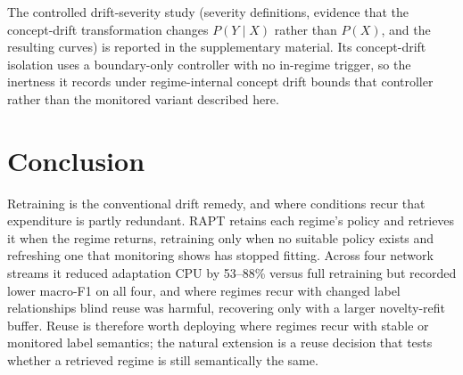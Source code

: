 \documentclass[conference]{IEEEtran}
\begin{document}
The controlled drift-severity study (severity definitions, evidence that the
concept-drift transformation changes $P(Y\mid X)$ rather than $P(X)$, and the
resulting curves) is reported in the supplementary material. Its concept-drift
isolation uses a boundary-only controller with no in-regime trigger, so the inertness
it records under regime-internal concept drift bounds that controller rather than the
monitored variant described here.



\section{Conclusion}

Retraining is the conventional drift remedy, and where conditions recur that
expenditure is partly redundant. RAPT retains each regime's policy and retrieves it
when the regime returns, retraining only when no suitable policy exists and refreshing
one that monitoring shows has stopped fitting. Across four network streams it reduced
adaptation CPU by 53--88\% versus full retraining but recorded lower macro-F1 on all
four, and where regimes recur with changed label relationships blind reuse was
harmful, recovering only with a larger novelty-refit buffer. Reuse is therefore worth
deploying where regimes recur with stable or monitored label semantics; the natural
extension is a reuse decision that tests whether a retrieved regime is still
semantically the same.
\end{document}
